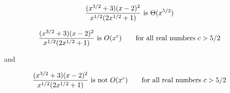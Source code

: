 $${(x^{3/2}+3)(x-2)^2\over x^{1/2}(2x^{1/2}+1)}\hbox{ is } \Theta(x^{5/2})$$

$${(x^{3/2}+3)(x-2)^2\over x^{1/2}(2x^{1/2}+1)}\hbox{ is } O(x^c)\qquad\hbox{for all real numbers $c>5/2$}$$

and

$${(x^{3/2}+3)(x-2)^2\over x^{1/2}(2x^{1/2}+1)}\hbox{ is not } O(x^c)\qquad\hbox{for all real numbers $c>5/2$}$$


\filbreak
\vfill\eject
\bye
